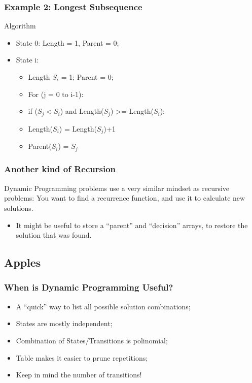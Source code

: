 \documentclass{beamer}
\begin{document}
\begin{frame}
  \frametitle{Example 2: Longest Subsequence}
  \begin{block}{Algorithm}
    \begin{itemize}
    \item State 0: Length = 1, Parent = 0;
    \item State i: 
      \begin{itemize}
      \item Length $S_i$ = 1; Parent = 0;
      \item For (j = 0 to i-1): 
      \item if ($S_j < S_i$) and Length($S_j$) >= Length($S_i$):
      \item Length($S_i$) = Length($S_j$)+1
      \item Parent($S_i$) = $S_j$
      \end{itemize}
    \end{itemize}
  \end{block}
\end{frame}

\begin{frame}
  \frametitle{Another kind of Recursion}
  \begin{block}{}
    Dynamic Programming problems use a very similar mindset as
    recursive problems: You want to find a recurrence function, and
    use it to calculate new solutions.
  \end{block}
  \bigskip

  \begin{itemize}
    \item It might be useful to store a ``parent'' and ``decision''
      arrays, to restore the solution that was found.
  \end{itemize}
\end{frame}

\subsection{Apples}

\begin{frame}
  \frametitle{When is Dynamic Programming Useful?}
  \begin{itemize}
  \item A ``quick'' way to list all possible solution combinations;
  \item States are mostly independent;
  \item Combination of States/Transitions is polinomial;
  \item Table makes it easier to prune repetitions;
    \bigskip
  \item \alert{Keep in mind the number of transitions!}
  \end{itemize}
\end{frame}
\end{document}
